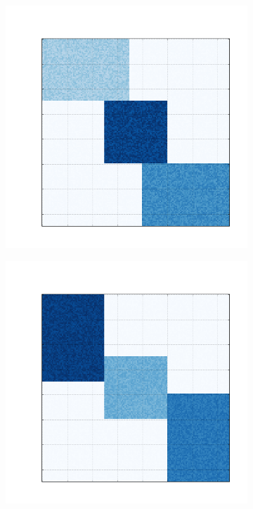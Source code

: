 \documentclass[
    12pt,                %
    oneside,            %
    a4paper,            %
    english,            %
    brazil                %
    ]{abntex2ppgsi}
\begin{document}
\begin{figure}[H]
\begin{subfigure}[b]{0.18\textwidth}
    \end{subfigure}
    \begin{subfigure}[b]{0.18\textwidth}
        \includegraphics[width=\textwidth]{img/d-bic-structure.png}
    \end{subfigure}
    \begin{subfigure}[b]{0.18\textwidth}
        \includegraphics[width=\textwidth]{img/e-bic-structure.png}
    \end{subfigure}


\end{figure}
\end{document}
